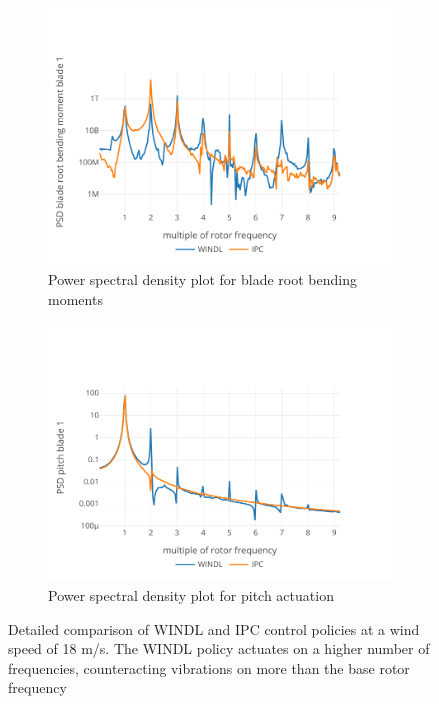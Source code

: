 \begin{figure}
\begin{subfigure}[b]{0.48\textwidth}
    \centering
    \includegraphics[width=\textwidth]{images/steady_rollout_blade_psd.pdf}
    \caption{Power spectral density plot for blade root bending moments}
    \label{fig:steady-rollout-blade-psd}
  \end{subfigure}
  \begin{subfigure}[b]{0.48\textwidth}
    \centering
    \includegraphics[width=\textwidth]{images/steady_rollout_pitch_psd.pdf}
    \caption{Power spectral density plot for pitch actuation}
    \label{fig:steady-rollout-pitch-psd}
  \end{subfigure}
  \caption{Detailed comparison of WINDL and IPC control policies at a wind speed of 18 m/s. The WINDL policy actuates on a higher number of frequencies, counteracting vibrations on more than the base rotor frequency}
  \label{fig:steady-rollout}
\end{figure}

